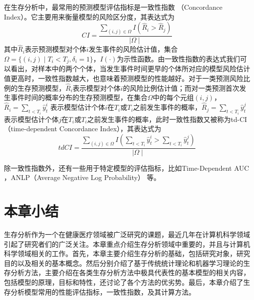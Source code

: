 在生存分析中，最常用的预测模型评估指标是一致性指数 （Concordance Index）。它主要用来衡量模型的风险区分度，其表达式为
\begin{equation}
CI=\frac{\sum_{(i,j)\in \Omega} I(\hat{R}_i > \hat{R}_j)}{\mid \Omega \mid} \label{F13}
\end{equation}
其中$\hat{R}_i$表示预测模型对个体$i$发生事件的风险估计值，集合$\Omega=\{(i,j)\mid T_i<T_j,\delta_i=1\}$，$I(\cdot)$为示性函数。由一致性指数的表达式我们可以看出，对样本中的两个个体，当发生事件时间更早的个体所对应的模型风险估计值更高时，一致性指数越大，也意味着预测模型的性能越好。对于一类预测风险比例的生存预测模型，$\hat{R}_i$表示模型对个体$i$的风险比例估计值；而对一类预测首次发生事件时间的概率分布的生存预测模型，在集合$\Omega$中的每个元组$(i,j)$，$\hat{R}_i=\sum_{t<T_i} \hat{y}_t^i$ 表示模型估计个体$i$在$T_i$或$T_i$之前发生事件的概率，$\hat{R}_j=\sum_{t<T_i} \hat{y}_t^j$ 表示模型估计个体$j$在$T_i$或$T_i$之前发生事件的概率，此时一致性指数又被称为td-CI （time-dependent Concordance Index），其表达式为
\begin{equation}
tdCI=\frac{\sum_{(i,j)\in \Omega} I(\sum_{t<T_i} \hat{y}_t^i > \sum_{t<T_i} \hat{y}_t^j)}{\mid \Omega \mid} \label{F14}
\end{equation}

除一致性指数外，还有一些用于特定模型的评估指标，比如Time-Dependent AUC ，ANLP（Average Negative Log Probability） 等。

\section{本章小结}

生存分析作为一个在健康医疗领域被广泛研究的课题，最近几年在计算机科学领域引起了研究者们的广泛关注。本章重点介绍生存分析领域中重要的，并且与计算机科学领域相关的工作。首先，本章主要介绍生存分析的基础，包括研究对象，研究目的以及相关的基本概念。然后分别介绍了基于传统统计理论和机器学习理论的生存分析方法，主要介绍在各类生存分析方法中极具代表性的基本模型的相关内容，包括模型的原理，目标和特性，还讨论了各个方法的优劣势。最后，本章介绍了生存分析模型常用的性能评估指标，一致性指数，及其计算方法。
